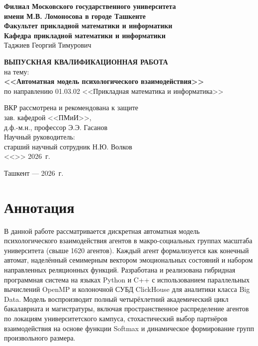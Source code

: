 \documentclass[12pt]{article}
\begin{document}
\begin{titlepage}
    \centering
    \textbf{Филиал Московского государственного университета\\
    имени М.В. Ломоносова в городе Ташкенте\\
    Факультет прикладной математики и информатики\\
    Кафедра прикладной математики и информатики\\}
    \vfill
    {\large Таджиев Георгий Тимурович}
    \vspace{1cm}

    \textbf{\Large ВЫПУСКНАЯ КВАЛИФИКАЦИОННАЯ РАБОТА}\\
    \vspace{0.5cm}
    на тему: \\[0.3cm]
    \textbf{\Large{<<Автоматная модель психологического взаимодействия>>}}\\
    \vspace{0.5cm}
    по направлению 01.03.02 <<Прикладная математика и информатика>>\\
    \vfill
    \begin{flushright}
        ВКР рассмотрена и рекомендована к защите\\
        зав. кафедрой <<ПМиИ>>,\\
        д.ф.-м.н., профессор \underline{\hspace{3cm}} Э.Э. Гасанов\\
        \vspace{0.5cm}
        Научный руководитель:\\
        старший научный сотрудник \underline{\hspace{3cm}} Н.Ю. Волков\\
        \vspace{0.3cm}
        <<\underline{\hspace{1cm}}>> \underline{\hspace{3cm}} 2026~г.\\
    \end{flushright}
    \vfill
    Ташкент --- 2026~г.
\end{titlepage}
\setcounter{page}{2}
\clearpage

\section*{Аннотация}
В данной работе рассматривается дискретная автоматная модель психологического взаимодействия агентов в макро-социальных группах масштаба университета (свыше 1620 агентов). Каждый агент формализуется как конечный автомат, наделённый семимерным вектором эмоциональных состояний и набором направленных реляционных функций. Разработана и реализована гибридная программная система на языках Python и C++ с использованием параллельных вычислений OpenMP и колоночной СУБД ClickHouse для аналитики класса Big Data. Модель воспроизводит полный четырёхлетний академический цикл бакалавриата и магистратуры, включая пространственное распределение агентов по локациям университетского кампуса, стохастический выбор партнёров взаимодействия на основе функции Softmax и динамическое формирование групп произвольного размера.
\end{document}
